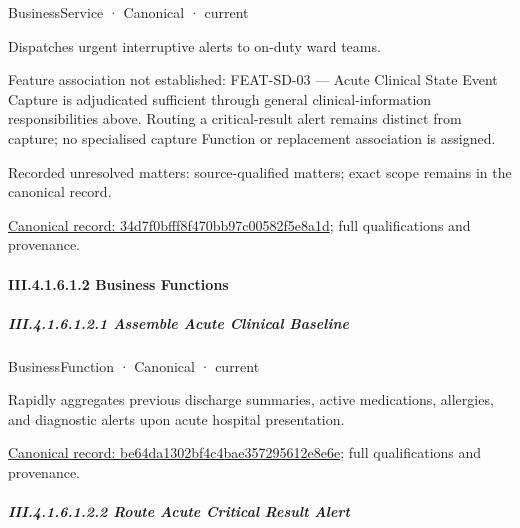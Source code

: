 \label{element:34d7f0bfff8f470bb97c00582f5e8a1d}
{\small BusinessService · Canonical · current}\par

Dispatches urgent interruptive alerts to on-duty ward teams.



Feature association not established: FEAT-SD-03 — Acute Clinical State Event Capture is adjudicated sufficient through general clinical-information responsibilities above. Routing a critical-result alert remains distinct from capture; no specialised capture Function or replacement association is assigned.


{\small Recorded unresolved matters: source-qualified matters; exact scope remains in the canonical record.}\par
{\footnotesize \href{../../../../../../../continuum/business/business-service/34d7f0bfff8f470bb97c00582f5e8a1d.md}{Canonical record: 34d7f0bfff8f470bb97c00582f5e8a1d}; full qualifications and provenance.}\par
\paragraph*{III.4.1.6.1.2 Business Functions}
\label{navigation:III.4.1.6.1.2}

\subparagraph*{III.4.1.6.1.2.1 Assemble Acute Clinical Baseline}
\label{navigation:III.4.1.6.1.2.1}

\label{element:be64da1302bf4c4bae357295612e8e6e}
{\small BusinessFunction · Canonical · current}\par

Rapidly aggregates previous discharge summaries, active medications, allergies, and diagnostic alerts upon acute hospital presentation.


{\footnotesize \href{../../../../../../../continuum/business/business-function/be64da1302bf4c4bae357295612e8e6e.md}{Canonical record: be64da1302bf4c4bae357295612e8e6e}; full qualifications and provenance.}\par
\subparagraph*{III.4.1.6.1.2.2 Route Acute Critical Result Alert}
\label{navigation:III.4.1.6.1.2.2}

